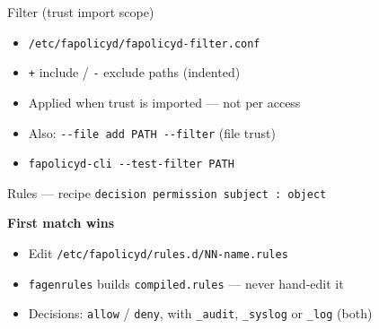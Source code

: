 \documentclass[aspectratio=169,11pt]{beamer}
\newcommand{\ok}[1]{\textcolor{allowc}{#1}}
\newcommand{\no}[1]{\textcolor{denyc}{#1}}
\newcommand{\dd}{-{}-}
\begin{document}
\begin{frame}{Filter (trust import scope)}
  \begin{itemize}
    \item \texttt{/etc/fapolicyd/fapolicyd-filter.conf}
    \item \texttt{+} include / \texttt{-} exclude paths (indented)
    \item Applied when trust is imported --- not per access
    \item Also: \texttt{\dd file add PATH \dd filter} (file trust)
    \item \texttt{fapolicyd-cli \dd test-filter PATH}
  \end{itemize}
\end{frame}

\begin{frame}{Rules --- recipe}
  \centering
  {\large\texttt{decision permission subject : object}}
  \vspace{0.6em}

  \textbf{First match wins}
  \vspace{0.8em}

  \raggedright
  \begin{itemize}
    \item Edit \texttt{/etc/fapolicyd/rules.d/NN-name.rules}
    \item \texttt{fagenrules} builds \texttt{compiled.rules} --- never hand-edit it
    \item Decisions: \ok{\texttt{allow}} / \no{\texttt{deny}}, with
          \texttt{\_audit}, \texttt{\_syslog} or \texttt{\_log} (both)
  \end{itemize}
\end{frame}
\end{document}
